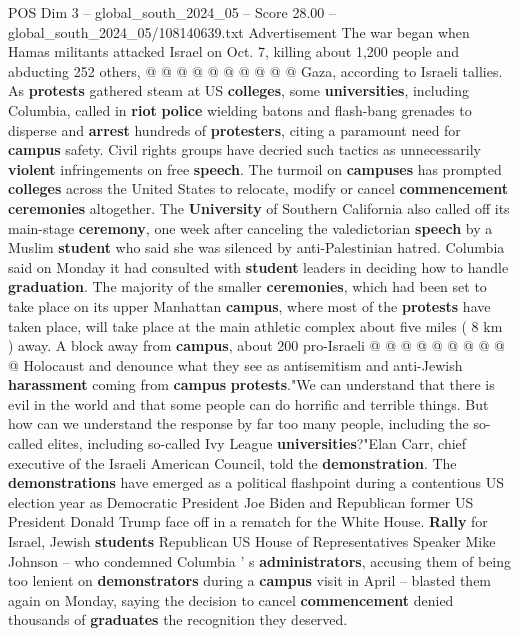 \begin{textsample}{POS Dim 3 – global\_south\_2024\_05 – Score 28.00 – global\_south\_2024\_05/108140639.txt}
Advertisement The war began when Hamas militants attacked Israel on Oct. 7, killing about 1,200 people and abducting 252 others, @ @ @ @ @ @ @ @ @ @ Gaza, according to Israeli tallies.
As \textbf{protests} gathered steam at US \textbf{colleges}, some \textbf{universities}, including Columbia, called in \textbf{riot} \textbf{police} wielding batons and flash-bang grenades to disperse and \textbf{arrest} hundreds of \textbf{protesters}, citing a paramount need for \textbf{campus} safety.
Civil rights groups have decried such tactics as unnecessarily \textbf{violent} infringements on free \textbf{speech}.
The turmoil on \textbf{campuses} has prompted \textbf{colleges} across the United States to relocate, modify or cancel \textbf{commencement} \textbf{ceremonies} altogether.
The \textbf{University} of Southern California also called off its main-stage \textbf{ceremony}, one week after canceling the valedictorian \textbf{speech} by a Muslim \textbf{student} who said she was silenced by anti-Palestinian hatred.
Columbia said on Monday it had consulted with \textbf{student} leaders in deciding how to handle \textbf{graduation}.
The majority of the smaller \textbf{ceremonies}, which had been set to take place on its upper Manhattan \textbf{campus}, where most of the \textbf{protests} have taken place, will take place at the main athletic complex about five miles ( 8 km ) away.
A block away from \textbf{campus}, about 200 pro-Israeli @ @ @ @ @ @ @ @ @ @ Holocaust and denounce what they see as antisemitism and anti-Jewish \textbf{harassment} coming from \textbf{campus} \textbf{protests}."We can understand that there is evil in the world and that some people can do horrific and terrible things.
But how can we understand the response by far too many people, including the so-called elites, including so-called Ivy League \textbf{universities}?"Elan Carr, chief executive of the Israeli American Council, told the \textbf{demonstration}.
The \textbf{demonstrations} have emerged as a political flashpoint during a contentious US election year as Democratic President Joe Biden and Republican former US President Donald Trump face off in a rematch for the White House. \textbf{Rally} for Israel, Jewish \textbf{students} Republican US House of Representatives Speaker Mike Johnson -- who condemned Columbia ' s \textbf{administrators}, accusing them of being too lenient on \textbf{demonstrators} during a \textbf{campus} visit in April -- blasted them again on Monday, saying the decision to cancel \textbf{commencement} denied thousands of \textbf{graduates} the recognition they deserved.

\end{textsample}
